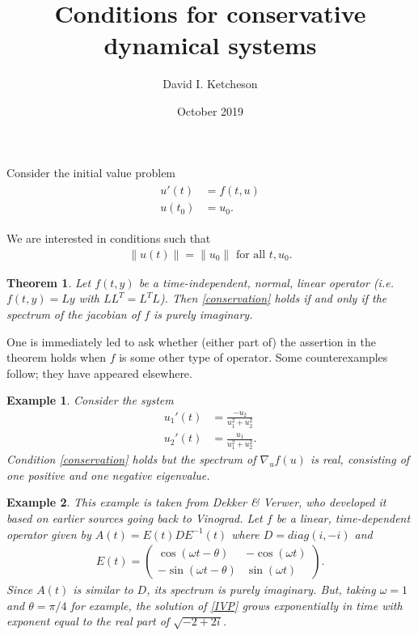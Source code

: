 \documentclass{article}
\title{Conditions for conservative dynamical systems}
\author{David I. Ketcheson}
\date{October 2019}
\newtheorem{example}{Example}
\newtheorem{theorem}{Theorem}
\begin{document}
\maketitle

Consider the initial value problem
\begin{align} \label{IVP}
\begin{split}
    u'(t) & = f(t,u) \\
    u(t_0) & = u_0.
\end{split}
\end{align}

We are interested in conditions such that
\begin{align} \label{conservation}
\|u(t)\| = \|u_0\| \text{ for all } t, u_0.
\end{align}

\begin{theorem}
Let $f(t,y)$ be a time-independent, normal, linear operator
(i.e. $f(t,y)=Ly$ with $LL^T=L^T L$).  Then \eqref{conservation} holds
if and only if the spectrum of the jacobian of $f$
is purely imaginary.
\end{theorem}

One is immediately led to ask whether (either part of) the assertion in the theorem holds when $f$ is some other type of operator.  Some counterexamples follow; they have appeared elsewhere.

\begin{example}
Consider the system
\begin{subequations} \label{nonlinear-ode}
\begin{align}
u_1'(t) & = \frac{-u_2}{u_1^2 + u_2^2} \\
u_2'(t) & = \frac{ u_1}{u_1^2 + u_2^2}.
\end{align}
\end{subequations}
Condition \eqref{conservation} holds but the spectrum of $\nabla_u f(u)$
is real, consisting of one positive and one negative eigenvalue.
\end{example}

\begin{example}
This example is taken from Dekker \& Verwer, who developed it based on earlier sources
going back to Vinograd.  Let $f$ be a linear, time-dependent operator given by $A(t) = E(t) D E^{-1}(t)$ where $D=diag(i,-i)$ and
\begin{align*}
E(t) = \begin{pmatrix}
\cos(\omega t - \theta) & -\cos(\omega t) \\
-\sin(\omega t - \theta) & \sin(\omega t)
\end{pmatrix}.
\end{align*}
Since $A(t)$ is similar to $D$, its spectrum is purely imaginary.  But, taking
$\omega=1$ and $\theta=\pi/4$ for example, the solution of \eqref{IVP} grows exponentially in time with
exponent equal to the real part of $\sqrt{-2+2i}$.
\end{example}
\end{document}
